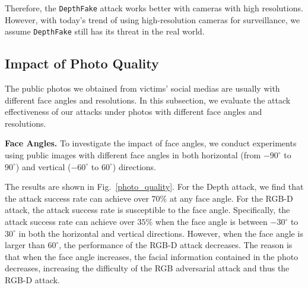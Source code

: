 Therefore, the \texttt{DepthFake} attack works better with cameras with high resolutions. However, with today's trend of using high-resolution cameras for surveillance, we assume \texttt{DepthFake}  still has its threat in the real world.




\subsection{Impact of Photo Quality}


The public photos we obtained from victims' social medias are usually with different face angles and resolutions. In this subsection, we evaluate the attack effectiveness of our attacks under photos with different face angles and resolutions.


\textbf{Face Angles.}
To investigate the impact of face angles, we conduct experiments using public images with different face angles in both horizontal (from $-90^\circ$ to $90^\circ$) and vertical  ($-60^\circ$ to $60^\circ$) directions. 

The results are shown in Fig.~\ref{photo_quality}. For the Depth attack, we find that the attack success rate can achieve over $70\%$ at any face angle. 
For the RGB-D attack, the attack success rate is susceptible to the face angle. Specifically, the attack success rate can achieve over $35\%$ when the face angle is between $-30^\circ$  to $30^\circ$ in both the horizontal and vertical directions. However, when the face angle is larger than $60^\circ$, the performance of the RGB-D attack decreases.
The reason is that when the face angle increases, the facial information contained in the photo decreases, increasing the difficulty of the RGB adversarial attack and thus the RGB-D attack.

